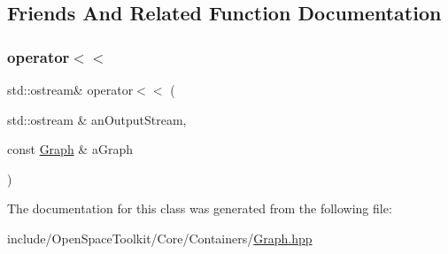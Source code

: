 \subsection{Friends And Related Function Documentation}
\mbox{\label{classostk_1_1core_1_1ctnr_1_1_graph_a225f9b61ac2385ccf05891298c7ab6b1}} 
\subsubsection{\texorpdfstring{operator$<$$<$}{operator<<}}
{\footnotesize\ttfamily std\+::ostream\& operator$<$$<$ (\begin{DoxyParamCaption}\item[{std\+::ostream \&}]{an\+Output\+Stream,  }\item[{const \hyperlink{classostk_1_1core_1_1ctnr_1_1_graph}{Graph} \&}]{a\+Graph }\end{DoxyParamCaption})\hspace{0.3cm}{\ttfamily [friend]}}



The documentation for this class was generated from the following file\+:\begin{DoxyCompactItemize}
\item 
include/\+Open\+Space\+Toolkit/\+Core/\+Containers/\hyperlink{_graph_8hpp}{Graph.\+hpp}\end{DoxyCompactItemize}
